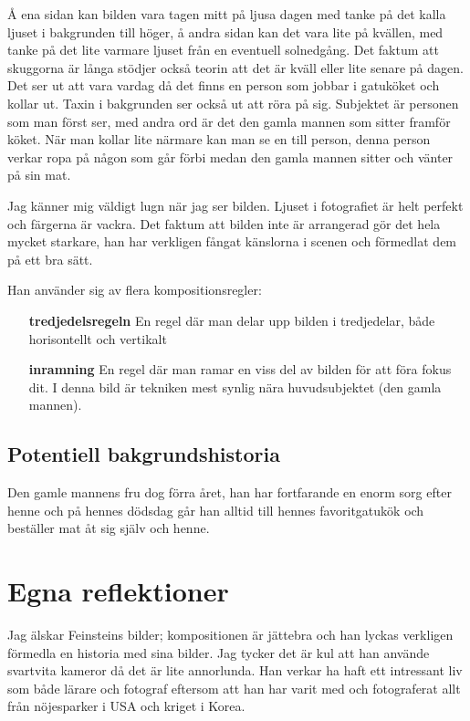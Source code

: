 \documentclass{article}
\begin{document}
Å ena sidan kan bilden vara tagen mitt på ljusa dagen med tanke på det kalla ljuset i bakgrunden till höger, å andra sidan 
kan det vara lite på kvällen, med tanke på det lite varmare ljuset från en eventuell solnedgång. Det faktum att skuggorna är långa stödjer
också teorin att det är kväll eller lite senare på dagen. Det ser ut att vara vardag då det finns en person som jobbar i gatuköket och kollar ut.
Taxin i bakgrunden ser också ut att röra på sig. Subjektet är personen som man först ser, med andra ord är det den gamla mannen som sitter framför köket. När man kollar lite närmare kan man se en till person,
denna person verkar ropa på någon som går förbi medan den gamla mannen sitter och vänter på sin mat.

Jag känner mig väldigt lugn när jag ser bilden. Ljuset i fotografiet är helt perfekt och färgerna är vackra.
Det faktum att bilden inte är arrangerad gör det hela mycket starkare, han har verkligen fångat känslorna i scenen och förmedlat dem på ett bra sätt.

Han använder sig av flera kompositionsregler:
\begin{itemize}
	\item [\bfseries{tredjedelsregeln}] En regel där man delar upp bilden i tredjedelar, både horisontellt och vertikalt
	\item [\bfseries{inramning}] En regel där man ramar en viss del av bilden för att föra fokus dit. I denna bild är tekniken mest synlig nära huvudsubjektet (den gamla mannen).
\end{itemize}

\subsection{Potentiell bakgrundshistoria}
Den gamle mannens fru dog förra året, han har fortfarande en enorm sorg efter henne och på hennes dödsdag går han alltid till hennes favoritgatukök och beställer mat åt sig själv och henne.

\section{Egna reflektioner}
Jag älskar Feinsteins bilder; kompositionen är jättebra och han lyckas verkligen förmedla en 
historia med sina bilder. Jag tycker det är kul att han använde svartvita kameror då det är
lite annorlunda. Han verkar ha haft ett intressant liv som både lärare och fotograf eftersom att han har
varit med och fotograferat allt från nöjesparker i USA och kriget i Korea.

\newpage
\printbibliography{}
\end{document}

